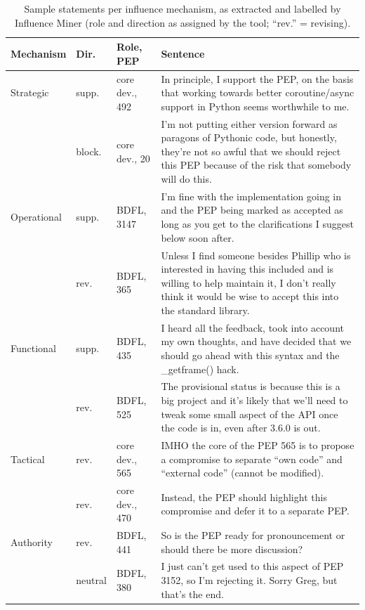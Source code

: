 \documentclass[sigconf,screen]{acmart}
\begin{document}
\begin{table}
\caption{Sample statements per influence mechanism, as extracted and labelled by Influence Miner (role and direction as assigned by the tool; ``rev.'' = revising).}
\label{tab:samples}
\small
\begin{tabular}{p{}p{}p{}p{}}
\toprule
\textbf{Mechanism} & \textbf{Dir.} & \textbf{Role, PEP} & \textbf{Sentence} \\
\midrule
Strategic & supp. & core dev., 492 & In principle, I support the PEP, on the basis that working towards better coroutine/async support in Python seems worthwhile to me. \\
 & block. & core dev., 20 & I'm not putting either version forward as paragons of Pythonic code, but honestly, they're not so awful that we should reject this PEP because of the risk that somebody will do this. \\
\midrule
Operational & supp. & BDFL, 3147 & I'm fine with the implementation going in and the PEP being marked as accepted as long as you get to the clarifications I suggest below soon after. \\
 & rev. & BDFL, 365 & Unless I find someone besides Phillip who is interested in having this included and is willing to help maintain it, I don't really think it would be wise to accept this into the standard library. \\
\midrule
Functional & supp. & BDFL, 435 & I heard all the feedback, took into account my own thoughts, and have decided that we should go ahead with this syntax and the \_getframe() hack. \\
 & rev. & BDFL, 525 & The provisional status is because this is a big project and it's likely that we'll need to tweak some small aspect of the API once the code is in, even after 3.6.0 is out. \\
\midrule
Tactical & rev. & core dev., 565 & IMHO the core of the PEP 565 is to propose a compromise to separate ``own code'' and ``external code'' (cannot be modified). \\
 & rev. & core dev., 470 & Instead, the PEP should highlight this compromise and defer it to a separate PEP. \\
\midrule
Authority & rev. & BDFL, 441 & So is the PEP ready for pronouncement or should there be more discussion? \\
 & neutral & BDFL, 380 & I just can't get used to this aspect of PEP 3152, so I'm rejecting it. Sorry Greg, but that's the end. \\

\end{tabular}
\end{table}
\end{document}

